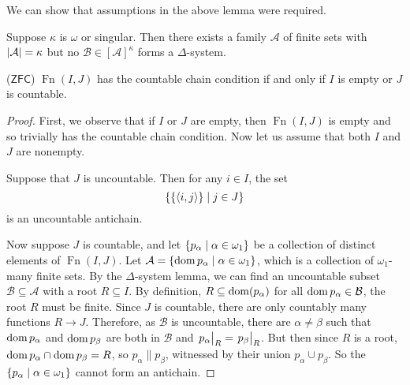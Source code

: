 We can show that assumptions in the above lemma were required.
\begin{proposition}
    Suppose \( \kappa \) is \( \omega \) or singular.
    Then there exists a family \( \mathcal A \) of finite sets with \( \abs{\mathcal A} = \kappa \) but no \( \mathcal B \in [\mathcal A]^\kappa \) forms a \( \Delta \)-system.
\end{proposition}
\begin{lemma}
    (\( \mathsf{ZFC} \))
    \( \operatorname{Fn}(I, J) \) has the countable chain condition if and only if \( I \) is empty or \( J \) is countable.
\end{lemma}
\begin{proof}
    First, we observe that if \( I \) or \( J \) are empty, then \( \operatorname{Fn}(I, J) \) is empty and so trivially has the countable chain condition.
    Now let us assume that both \( I \) and \( J \) are nonempty.

    Suppose that \( J \) is uncountable.
    Then for any \( i \in I \), the set
    \[ \qty{\qty{\langle i, j \rangle} \mid j \in J} \]
    is an uncountable antichain.

    Now suppose \( J \) is countable, and let \( \qty{p_\alpha \mid \alpha \in \omega_1} \) be a collection of distinct elements of \( \operatorname{Fn}(I, J) \).
    Let \( \mathcal A = \qty{\operatorname{dom}p_\alpha \mid \alpha \in \omega_1} \), which is a collection of \( \omega_1 \)-many finite sets.
    By the \( \Delta \)-system lemma, we can find an uncountable subset \( \mathcal B \subseteq \mathcal A \) with a root \( R \subseteq I \).
    By definition, \( R \subseteq \operatorname{dom}(p_\alpha) \) for all \( \operatorname{dom} p_\alpha \in \mathcal B \), the root \( R \) must be finite.
    Since \( J \) is countable, there are only countably many functions \( R \to J \).
    Therefore, as \( \mathcal B \) is uncountable, there are \( \alpha \neq \beta \) such that \( \operatorname{dom} p_\alpha \) and \( \operatorname{dom} p_\beta \) are both in \( \mathcal B \) and \( \eval{p_\alpha}_R = \eval{p_\beta}_R \).
    But then since \( R \) is a root, \( \operatorname{dom} p_\alpha \cap \operatorname{dom} p_\beta = R \), so \( p_\alpha \mathrel\| p_\beta \), witnessed by their union \( p_\alpha \cup p_\beta \).
    So the \( \qty{p_\alpha \mid \alpha \in \omega_1} \) cannot form an antichain.
\end{proof}

